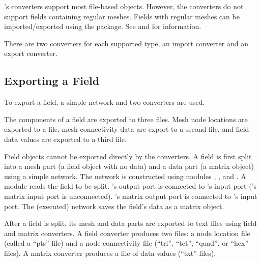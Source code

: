 
\sr{}'s converters support most \sr{} file-based objects.  However,
the converters do not support fields containing regular meshes.
Fields with regular meshes can be imported/exported using the
 package.  See  and
for information.

There are two converters for each supported \sr{} type, an import
converter and an export converter.

\subsection{Exporting a Field}
\label{sec:export_field}

To export a field, a simple \sci{} network and two converters are used.

The components of a field are exported to three files.  Mesh node
locations are exported to a file, mesh connectivity data are export to
a second file, and field data values are exported to a third file.

Field objects cannot be exported directly by the converters.  A field
is first split into a mesh part (a field object with no data) and a
data part (a matrix object) using a simple \sr{} network.  The
network is constructed using modules ,
, and .  A
 module reads the field to be split.
's output port is connected to
's input port ('s
matrix input port is unconnected).  's
matrix output port is connected to 's input
port.  The (executed) network saves the field's data as a matrix object.

After a field is split, its mesh and data parts are exported to
text files using field and matrix converters.  A field converter
produces two files: a node location file (called a ``pts'' file) and a
node connectivity file (``tri'', ``tet'', ``quad'', or ``hex'' files).
A matrix converter produces a file of data values (``txt'' files).

